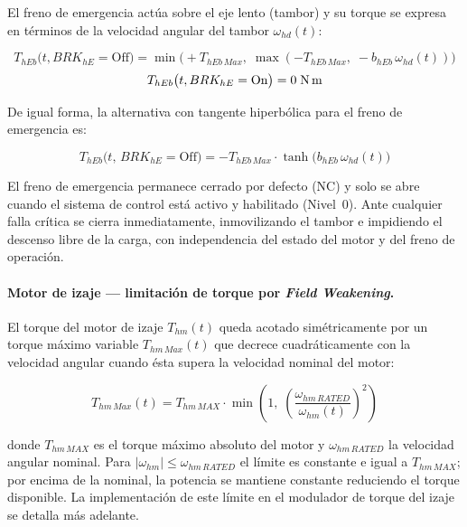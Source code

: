 \documentclass[12pt, a4paper]{article}
\begin{document}
El freno de emergencia actúa sobre el eje lento (tambor) y su torque se expresa en
términos de la velocidad angular del tambor $\omega_{hd}(t)$:

\begin{equation}
    \label{eq:freno-he-off}
    T_{hEb}\bigl(t,BRK_{hE} = \text{Off}\bigr)
    = \min\!\bigl(+T_{hEb\,Max},\;\max(-T_{hEb\,Max},\;-b_{hEb}\,\omega_{hd}(t))\bigr)
\end{equation}
\begin{equation}
    \label{eq:freno-he-on}
    T_{hEb}\bigl(t,BRK_{hE} = \text{On}\bigr) = 0\;\text{N\,m}
\end{equation}

\noindent De igual forma, la alternativa con tangente hiperbólica para el freno de emergencia es:

\begin{equation}
    \label{eq:freno-he-off-tanh}
    T_{hEb}\bigl(t,\,BRK_{hE} = \text{Off}\bigr) = -T_{hEb\,Max}\cdot\tanh\!\bigl(b_{hEb}\,\omega_{hd}(t)\bigr)
\end{equation}

El freno de emergencia permanece cerrado por defecto (NC) y solo se abre cuando el
sistema de control está activo y habilitado (Nivel~0). Ante cualquier falla crítica se
cierra inmediatamente, inmovilizando el tambor e impidiendo el descenso libre de la carga,
con independencia del estado del motor y del freno de operación.

\paragraph{Motor de izaje — limitación de torque por \textit{Field Weakening}.}

El torque del motor de izaje $T_{hm}(t)$ queda acotado simétricamente por un torque
máximo variable $T_{hm\,Max}(t)$ que decrece cuadráticamente con la velocidad angular
cuando ésta supera la velocidad nominal del motor:

\begin{equation}
    \label{eq:field-weakening}
    T_{hm\,Max}(t) = T_{hm\,MAX}\cdot\min\!\left(1,\;
    \left(\frac{\omega_{hm\,RATED}}{\omega_{hm}(t)}\right)^{\!2}\right)
\end{equation}

donde $T_{hm\,MAX}$ es el torque máximo absoluto del motor y $\omega_{hm\,RATED}$ la
velocidad angular nominal. Para $|\omega_{hm}| \leq \omega_{hm\,RATED}$ el límite es
constante e igual a $T_{hm\,MAX}$; por encima de la nominal, la potencia se mantiene
constante reduciendo el torque disponible. La implementación de este límite en el
modulador de torque del izaje se detalla más adelante.
\end{document}
